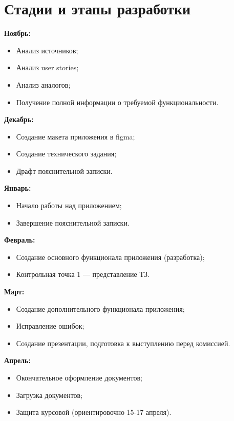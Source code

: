 \documentclass[draft]{article}
\begin{document}
\section {Стадии и этапы разработки}
\textbf{Ноябрь:}
\begin{itemize}
\item Анализ источников;
\item Анализ user stories;
\item Анализ аналогов;
\item Получение полной информации о требуемой функциональности.
\end{itemize}
\textbf{Декабрь:}
\begin{itemize}
\item Создание макета приложения в figma;
\item Создание технического задания;
\item Драфт пояснительной записки.
\end{itemize}
\textbf{Январь:}
\begin{itemize}
\item Начало работы над приложением;
\item Завершение пояснительной записки.
\end{itemize}
\textbf{Февраль:}
\begin{itemize}
\item Создание основного функционала приложения (разработка);
\item Контрольная точка 1 — представление ТЗ.
\end{itemize}
\textbf{Март:}
\begin{itemize}
\item Создание дополнительного функционала приложения;
\item Исправление ошибок;
\item Создание презентации, подготовка к выступлению перед комиссией.
\end{itemize}
\textbf{Апрель:}
\begin{itemize}
\item Окончательное оформление документов;
\item Загрузка документов;
\item Защита курсовой (ориентировочно 15-17 апреля).
\end{itemize}
\newpage
\end{document}
